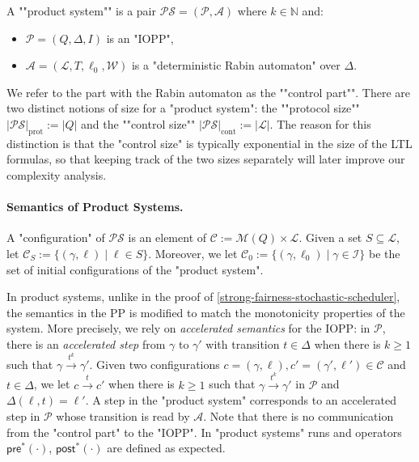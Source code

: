 \documentclass[10pt,a4paper]{article}
\let\mathbb\mathds
\renewcommand{\geq}{\geqslant}
\newcommand{\nats}{\mathbb{N}}
\newcommand{\set}[1]{\{#1\}}
\newcommand{\deff}{:=}
\newcommand{\multisetsof}[1]{\mathcal{M}(#1)}
\newcommand{\size}[1]{|#1|}
\newcommand{\prot}{\mathcal{P}}
\newcommand{\config}{\gamma}
\newcommand{\initialstates}{I}
\newcommand{\preop}{\mathsf{pre}}
\newcommand{\postop}{\mathsf{post}}
\newcommand{\prestar}[1]{\preop^*(#1)}
\newcommand{\poststar}[1]{\postop^*(#1)}
\newcommand{\step}[1]{\xrightarrow{#1}}
\newcommand{\transitions}{\Delta}
\newcommand*{\states}{Q}
\newcommand*{\atrans}{t}
\newcommand{\initial}{\mathcal{I}}   %
\newcommand*{\buchiaut}{\mathcal{A}}
\newcommand{\bstates}{\mathcal{L}}
\newcommand{\btransitions}{T}
\newcommand*{\abuchistate}{\ell}
\newcommand*{\bstate}{\abuchistate}
\newcommand*{\binitstate}{\bstate_0}
\newcommand*{\bwinning}{\mathcal{W}}
\newcommand{\prodsystem}{\mathcal{PS}}
\newcommand{\prodconfigs}{\mathcal{C}}
\newcommand{\prodconfigsproj}[1]{\prodconfigs_{#1}}
\newcommand{\controlsize}[1]{|#1|_{\mathrm{cont}}}
\newcommand{\protocolsize}[1]{|#1|_{\mathrm{prot}}}
\newcommand{\prodconfig}{c}
\newcommand{\prodinitialconfigs}{\prodconfigs_0}
\begin{document}
\begin{definition}
	A ""product system"" is a pair \(\prodsystem = (\prot, \buchiaut)\) where \(k \in \nats\) and:
	\begin{itemize}[noitemsep,topsep=0pt,parsep=0pt,partopsep=0pt]
		\item \(\prot = (\states, \transitions, \initialstates)\) is an "IOPP",
		\item \(\buchiaut = (\bstates, \btransitions, \binitstate, \bwinning)\) is a "deterministic Rabin automaton" over \(\transitions\).
	\end{itemize}
\end{definition}
We refer to the part with the Rabin automaton as the ""control part"".
There are two distinct notions of size for a "product system": the ""protocol size"" \(\protocolsize{\prodsystem} \deff \size{\states}\) and the ""control size"" \(\controlsize{\prodsystem} \deff \size{\bstates}\).
%
The reason for this distinction is that the "control size" is typically exponential in the size of the LTL formulas, so that keeping track of the two sizes separately will later improve our complexity analysis.

\paragraph*{Semantics of Product Systems.}
%
A "configuration" of \(\prodsystem\) is an element of \(\prodconfigs \deff \multisetsof{\states} \times \bstates\).
Given a set \(S \subseteq \bstates\), let \(\prodconfigsproj{S} \deff \set{(\config, \abuchistate) \mid \abuchistate \in S}\).
Moreover, we let \(\prodinitialconfigs \deff \set{(\config, \binitstate) \mid \config \in \initial}\) be the set of initial configurations of the "product system".

In product systems, unlike in the proof of \cref{strong-fairness-stochastic-scheduler}, the semantics in the PP is modified to match the monotonicity properties of the system.
More precisely, we rely on \emph{accelerated semantics} for the IOPP: in \(\prot\), there is an \emph{accelerated step} from \(\config\) to \(\config'\) with transition \(\atrans \in \transitions\) when there is \(k \geq 1\) such that \(\config \step{\atrans^k} \config'\).
Given two configurations \(\prodconfig = (\config,\bstate), \prodconfig' = (\config', \bstate') \in \prodconfigs\) and \(t \in \transitions\), we let \(\prodconfig \step{\atrans} \prodconfig'\) when there is \(k \geq 1\) such that \(\config \step{\atrans^k} \config'\) in \(\prot\) and \(\transitions(\abuchistate, \atrans) = \abuchistate'\).
A step in the "product system" corresponds to an accelerated step in \(\prot\) whose transition is read by \(\buchiaut\).
Note that there is no communication from the "control part" to the "IOPP".
In "product systems" runs and operators \(\prestar{\cdot}\), \(\poststar{\cdot}\) are defined as expected.
\end{document}
